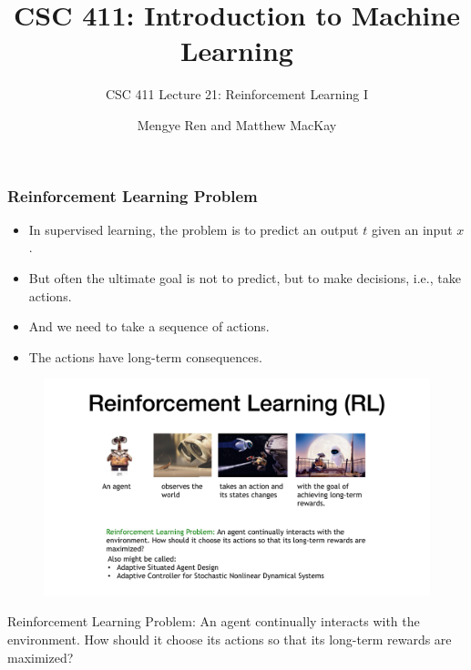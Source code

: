 \documentclass{beamer}
\title[CSC411 2019 Winter Lecture 21]{CSC 411: Introduction to Machine Learning}
\subtitle{CSC 411 Lecture 21: Reinforcement Learning I}
\author[UofT]{Mengye Ren and Matthew MacKay}
\institute[]{University of Toronto}
\date{}
\begin{document}
\begin{frame}
  \titlepage
\end{frame}








\begin{frame}\frametitle{Reinforcement Learning Problem}\small
\begin{itemize}
	\item In supervised learning, the problem is to predict an output $t$ given an input $x$.
	\item But often the ultimate goal is not to predict, but to make decisions, i.e., take actions.
	\item And we need to take a sequence of actions.
	\item The actions have long-term consequences.
\end{itemize}

\begin{figure}
	\includegraphics[width=0.75\linewidth]{Figures/RL_Problem}
\end{figure}

Reinforcement Learning Problem: An agent continually interacts with the environment. How should it choose its actions so that its long-term rewards are maximized?	
\end{frame}
\end{document}
